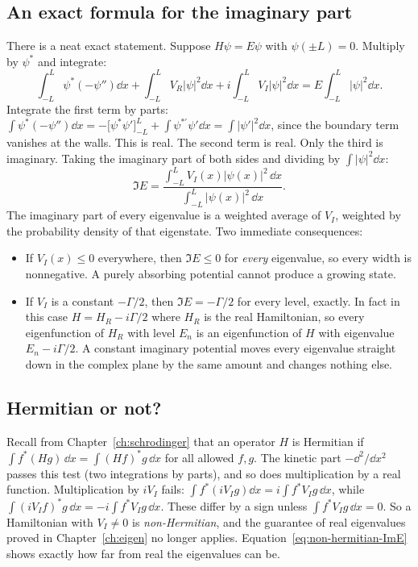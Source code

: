 \subsection{An exact formula for the imaginary part}

There is a neat exact statement. Suppose $H\psi = E\psi$ with $\psi(\pm L)=0$. Multiply by $\psi^*$ and integrate:
\begin{equation}
\int_{-L}^{L}\psi^*\left(-\psi''\right)\dd x + \int_{-L}^{L} V_R|\psi|^2\dd x + i\int_{-L}^{L}V_I|\psi|^2\dd x = E\int_{-L}^{L}|\psi|^2\dd x .
\end{equation}
Integrate the first term by parts: $\int\psi^*(-\psi'')\dd x = -\bigl[\psi^*\psi'\bigr]_{-L}^{L} + \int \psi^{*\prime}\psi'\dd x = \int|\psi'|^2\dd x$, since the boundary term vanishes at the walls. This is real. The second term is real. Only the third is imaginary. Taking the imaginary part of both sides and dividing by $\int|\psi|^2\dd x$:
\begin{equation}
\Im E = \frac{\int_{-L}^{L} V_I(x)|\psi(x)|^2\,\dd x}{\int_{-L}^{L}|\psi(x)|^2\,\dd x}.
\label{eq:non-hermitian-ImE}
\end{equation}
The imaginary part of every eigenvalue is a weighted average of $V_I$, weighted by the probability density of that eigenstate. Two immediate consequences:
\begin{itemize}
\item If $V_I(x)\le0$ everywhere, then $\Im E\le0$ for \emph{every} eigenvalue, so every width is nonnegative. A purely absorbing potential cannot produce a growing state.
\item If $V_I$ is a constant $-\Gamma/2$, then $\Im E=-\Gamma/2$ for every level, exactly. In fact in this case $H = H_R - i\Gamma/2$ where $H_R$ is the real Hamiltonian, so every eigenfunction of $H_R$ with level $E_n$ is an eigenfunction of $H$ with eigenvalue $E_n - i\Gamma/2$. A constant imaginary potential moves every eigenvalue straight down in the complex plane by the same amount and changes nothing else.
\end{itemize}

\subsection{Hermitian or not?}

Recall from Chapter~\ref{ch:schrodinger} that an operator $H$ is Hermitian if $\int f^*(Hg)\,\dd x = \int (Hf)^*g\,\dd x$ for all allowed $f,g$. The kinetic part $-\dd^2/\dd x^2$ passes this test (two integrations by parts), and so does multiplication by a real function. Multiplication by $iV_I$ fails: $\int f^*(iV_Ig)\dd x = i\int f^*V_I g\,\dd x$, while $\int(iV_If)^*g\,\dd x = -i\int f^*V_Ig\,\dd x$. These differ by a sign unless $\int f^*V_Ig\,\dd x=0$. So a Hamiltonian with $V_I\ne0$ is \emph{non-Hermitian}, and the guarantee of real eigenvalues proved in Chapter~\ref{ch:eigen} no longer applies. Equation~\eqref{eq:non-hermitian-ImE} shows exactly how far from real the eigenvalues can be.


